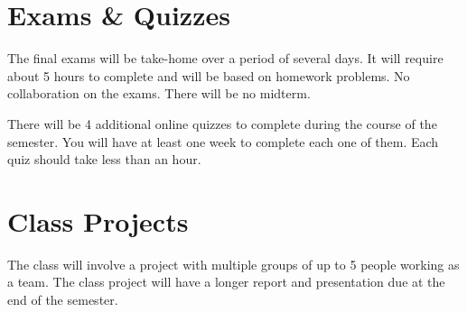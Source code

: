 \documentclass[11pt]{article}
\begin{document}
\section{Exams \& Quizzes}

The final exams will be take-home over a period of several days. It will require about 5 hours to complete and will be based on homework problems. No collaboration on the exams. There will be no midterm.

There will be 4 additional online quizzes to complete during the course of the semester. You will have at least one week to complete each one of them. Each quiz should take less than an hour.

\section{Class Projects}

The class will involve a project with multiple groups of up to 5 people working as a team. The class project will have a longer report and presentation due at the end of the semester.
\end{document}

